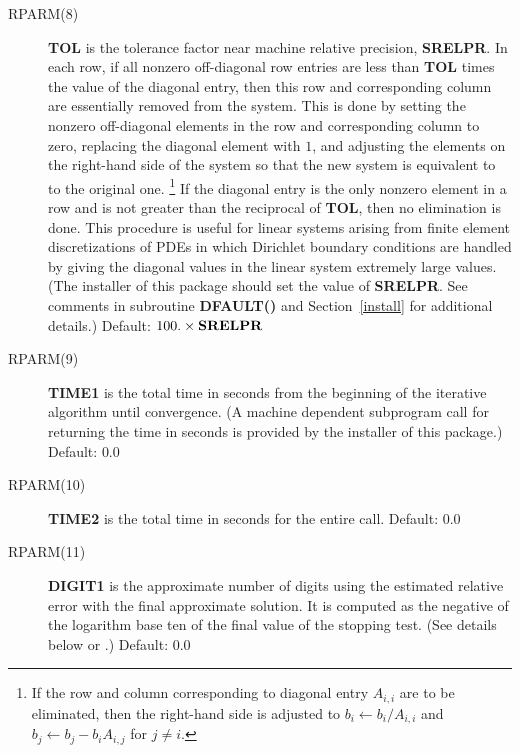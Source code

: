 \begin{description}
 \item[RPARM(8)] {\bf TOL} is the tolerance factor near machine relative 
                 precision, {\bf SRELPR}.  In each row, if all nonzero 
                 off-diagonal row entries are less than {\bf TOL} times 
                 the value of the diagonal entry, then this row and 
                 corresponding column are essentially removed from the 
                 system.  This is done by setting the nonzero off-diagonal 
                 elements in the row and corresponding column to zero, 
                 replacing the diagonal element with $1$, and adjusting 
                 the elements on the right-hand side of the system so that 
                 the new system is equivalent to to the original one.
                 \footnote{If the row and column corresponding to diagonal 
                 entry $A_{i,i}$ are to be eliminated, then the 
                 right-hand side is adjusted to $b_i \leftarrow b_i/A_{i,i}$ 
                 and $b_j \leftarrow b_j-b_i A_{i,j}$ for $j \neq i$.}  
                 If the diagonal entry is the only nonzero 
                 element in a row and is not greater than the reciprocal 
                 of {\bf TOL}, then no elimination is done.  This procedure 
                 is useful for linear systems arising from finite element 
                 discretizations of PDEs in which Dirichlet boundary 
                 conditions are handled by giving the diagonal values in 
                 the linear system extremely large values.  (The installer 
                 of this package should set the value of {\bf SRELPR}.
                 See comments in subroutine {\bf DFAULT()} and
                 Section~\ref{install} for additional details.)  Default: 
                 $100.\times{\bf SRELPR}$
 
 \item[RPARM(9)] {\bf TIME1} is the total time in seconds from the beginning
                 of the iterative algorithm until convergence.  (A machine
                 dependent subprogram call for returning the time in
                 seconds is provided by the installer of this package.)
                 Default: $0.0$
 
 \item[RPARM(10)] {\bf TIME2} is the total time in seconds for the entire 
                  call.  Default: $0.0$
 
 \item[RPARM(11)] {\bf DIGIT1} is the approximate number of digits using 
                  the estimated relative error with the final approximate
                  solution.  It is computed as the negative of the logarithm
                  base ten of the final value of the stopping test.  (See
                  details below or \cite{2}.)  Default: $0.0$
 

\end{description}
